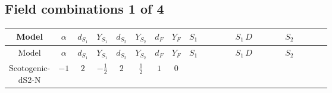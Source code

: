 \documentclass[8pt]{article}
\begin{document}
\begin{landscape}
\subsection*{Field combinations 1 of 4}
\begin{longtable}{@{}cccccccc >{\raggedright\arraybackslash}p{0.21\linewidth} >{\raggedright\arraybackslash}p{0.21\linewidth} >{\raggedright\arraybackslash}p{0.21\linewidth}@{}}
\toprule
Model & $\alpha$ & $d_{S_1}$ & $Y_{S_1}$ & $d_{S_2}$ & $Y_{S_2}$ & $d_F$ & $Y_F$ & $S_1$ & $S_1\,D$ & $S_2$ \\
\midrule
\endfirsthead
\toprule
Model & $\alpha$ & $d_{S_1}$ & $Y_{S_1}$ & $d_{S_2}$ & $Y_{S_2}$ & $d_F$ & $Y_F$ & $S_1$ & $S_1\,D$ & $S_2$ \\
\midrule
\endhead
Scotogenic-dS2-N & $-1$ & $2$ & $-\frac{1}{2}$ & $2$ & $\frac{1}{2}$ & $1$ & $0$ & \scriptsize\adjustbox{max width=\linewidth}{$\begin{gathered} -S_{1,j_1} S_{1,j_1}{}^{\dagger } m_1^2 \\ +\frac{1}{2} S_{1,j_3} S_{1,j_4} S_{1,j_1}{}^{\dagger } S_{1,j_2}{}^{\dagger } \mathcal{I}_{S_1,j_1,j_3,j_2,j_4}{}^1 \lambda_{S_1}^{(1)}^{(1)}\end{gathered}$} & \scriptsize\adjustbox{max width=\linewidth}{$\begin{gathered} +D_{\mu _1}\left(S_{1,j_1}\right){}^{\dagger } D_{\mu _1}\left(S_{1,j_1}\right)\end{gathered}$} & \scriptsize\adjustbox{max width=\linewidth}{$\begin{gathered} -m_2^2 S_{2,j_1} S_{2,j_1}{}^{\dagger } \\ +\frac{1}{2} S_{2,j_3} S_{2,j_4} S_{2,j_1}{}^{\dagger } S_{2,j_2}{}^{\dagger } \mathcal{I}_{S_2,j_1,j_3,j_2,j_4}{}^1 \lambda_{S_2}^{(1)}^{(1)}\end{gathered}$} \\
\midrule
\bottomrule
\end{longtable}
\clearpage

\end{landscape}
\end{document}
